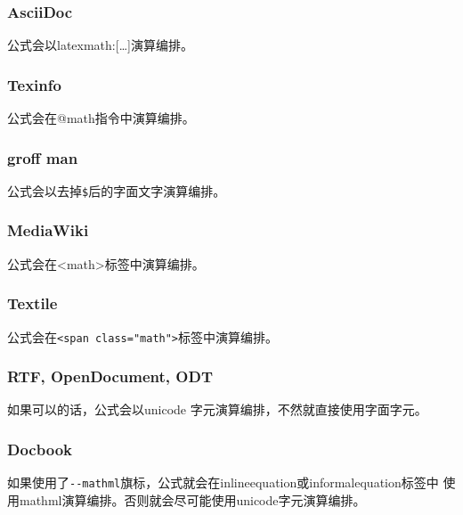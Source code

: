 \documentclass[fancyhdr,bookmark]{ctexbook}
\newcommand{\passthrough}[1]{#1}
\begin{document}
\hypertarget{asciidoc}{%
\subsubsection{AsciiDoc}\label{asciidoc}}

公式会以latexmath:{[}\ldots{]}演算编排。

\hypertarget{texinfo}{%
\subsubsection{Texinfo}\label{texinfo}}

公式会在@math指令中演算编排。

\hypertarget{groff-man}{%
\subsubsection{groff man}\label{groff-man}}

公式会以去掉\passthrough{\lstinline!$!}后的字面文字演算编排。

\hypertarget{mediawiki}{%
\subsubsection{MediaWiki}\label{mediawiki}}

公式会在\textless math\textgreater 标签中演算编排。

\hypertarget{textile}{%
\subsubsection{Textile}\label{textile}}

公式会在\passthrough{\lstinline!<span class="math">!}标签中演算编排。

\hypertarget{rtf-opendocument-odt}{%
\subsubsection{RTF, OpenDocument, ODT}\label{rtf-opendocument-odt}}

如果可以的话，公式会以unicode 字元演算编排，不然就直接使用字面字元。

\hypertarget{docbook}{%
\subsubsection{Docbook}\label{docbook}}

如果使用了\passthrough{\lstinline!--mathml!}旗标，公式就会在inlineequation或informalequation标签中
使用mathml演算编排。否则就会尽可能使用unicode字元演算编排。
\end{document}
